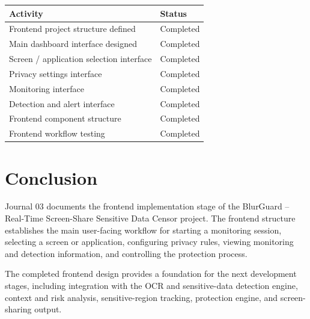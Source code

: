 \documentclass[12pt,a4paper]{article}
\begin{document}
\begin{center}
\renewcommand{\arraystretch}{1.2}

\begin{tabular}{|p{10.8cm}|p{5.4cm}|}
\hline

\textbf{Activity} & \textbf{Status}
\\
\hline

Frontend project structure defined & Completed
\\
\hline

Main dashboard interface designed & Completed
\\
\hline

Screen / application selection interface & Completed
\\
\hline

Privacy settings interface & Completed
\\
\hline

Monitoring interface & Completed
\\
\hline

Detection and alert interface & Completed
\\
\hline

Frontend component structure & Completed
\\
\hline

Frontend workflow testing & Completed
\\
\hline

\end{tabular}
\end{center}


\section{Conclusion}

Journal 03 documents the frontend implementation stage of the BlurGuard --
Real-Time Screen-Share Sensitive Data Censor project. The frontend structure
establishes the main user-facing workflow for starting a monitoring session,
selecting a screen or application, configuring privacy rules, viewing monitoring
and detection information, and controlling the protection process.

The completed frontend design provides a foundation for the next development
stages, including integration with the OCR and sensitive-data detection engine,
context and risk analysis, sensitive-region tracking, protection engine, and
screen-sharing output.
\end{document}

